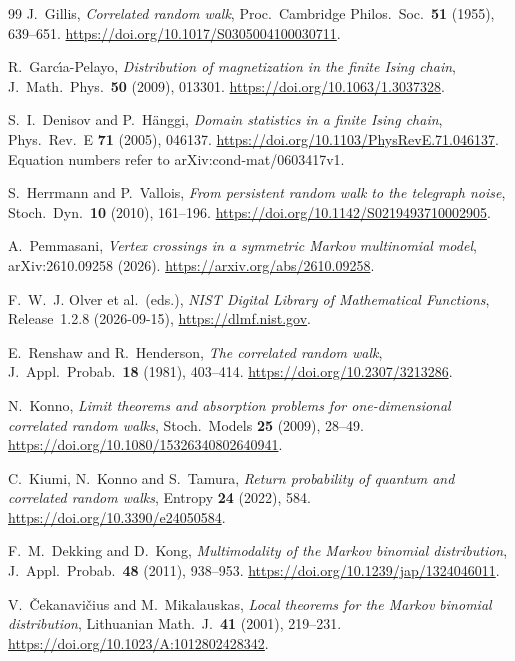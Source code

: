 \documentclass[11pt]{article}
\theoremstyle{definition}
\theoremstyle{remark}
\begin{document}
\begin{thebibliography}{99}
J.~Gillis, \emph{Correlated random walk}, Proc.\ Cambridge Philos.\ Soc.\ \textbf{51} (1955),
639--651. \url{https://doi.org/10.1017/S0305004100030711}.

R.~Garc\'{\i}a-Pelayo, \emph{Distribution of magnetization in the finite Ising
chain}, J.~Math.~Phys.\ \textbf{50} (2009), 013301.
\url{https://doi.org/10.1063/1.3037328}.

S.~I.~Denisov and P.~H\"anggi, \emph{Domain statistics in a finite Ising
chain}, Phys.~Rev.~E \textbf{71} (2005), 046137.
\url{https://doi.org/10.1103/PhysRevE.71.046137}. Equation numbers refer to
arXiv:cond-mat/0603417v1.

S.~Herrmann and P.~Vallois, \emph{From persistent random walk to the telegraph noise},
Stoch.\ Dyn.\ \textbf{10} (2010), 161--196.
\url{https://doi.org/10.1142/S0219493710002905}.

A.~Pemmasani, \emph{Vertex crossings in a symmetric Markov multinomial
model}, arXiv:2610.09258 (2026).
\url{https://arxiv.org/abs/2610.09258}.

F.~W.~J. Olver et al.\ (eds.), \emph{NIST Digital Library of Mathematical
Functions}, Release~1.2.8 (2026-09-15), \url{https://dlmf.nist.gov}.

E.~Renshaw and R.~Henderson, \emph{The correlated random walk}, J.\ Appl.\ Probab.\ \textbf{18}
(1981), 403--414.
\url{https://doi.org/10.2307/3213286}.

N.~Konno, \emph{Limit theorems and absorption problems for one-dimensional correlated random
walks}, Stoch.\ Models \textbf{25} (2009), 28--49.
\url{https://doi.org/10.1080/15326340802640941}.

C.~Kiumi, N.~Konno and S.~Tamura, \emph{Return probability of quantum and
correlated random walks}, Entropy \textbf{24} (2022), 584.
\url{https://doi.org/10.3390/e24050584}.

F.~M.~Dekking and D.~Kong, \emph{Multimodality of the Markov binomial distribution},
J.~Appl.~Probab.\ \textbf{48} (2011), 938--953.
\url{https://doi.org/10.1239/jap/1324046011}.

V.~\v{C}ekanavi\v{c}ius and M.~Mikalauskas,
\emph{Local theorems for the Markov binomial distribution},
Lithuanian Math.~J.~\textbf{41} (2001), 219--231.
\url{https://doi.org/10.1023/A:1012802428342}.


\end{thebibliography}
\end{document}
